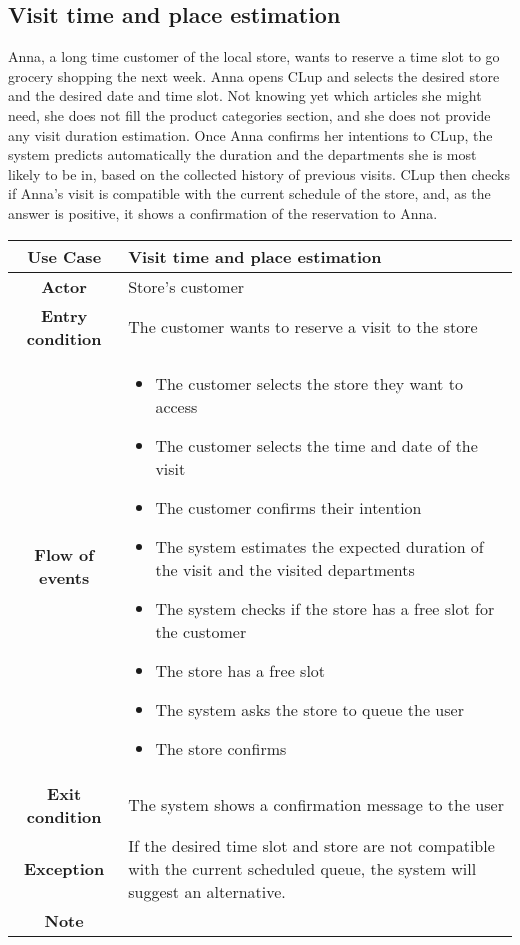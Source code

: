 \documentclass[../../main.tex]{subfiles}
\begin{document}
    \subsection*{Visit time and place estimation}

    Anna, a long time customer of the local store, wants to reserve a time slot to go grocery shopping the next week. 
    Anna opens CLup and selects the desired store and the desired date and time slot. 
    Not knowing yet which articles she might need, she does not fill the product categories section, 
    and she does not provide any visit duration estimation. Once Anna confirms her intentions to CLup, 
    the system predicts automatically the duration and the departments she is most likely to be in, 
    based on the collected history of previous visits. CLup then checks if Anna's visit is compatible with the 
    current schedule of the store, and, as the answer is positive, it shows a confirmation of the reservation to Anna.

    \begin{table}[H]
      \centering
        \begin{tabular}{c m{}}
        \hline
        \textbf{Use Case} & Visit time and place estimation\\ \hline
        \textbf{Actor} & Store's customer\\ \hline
        \textbf{Entry condition} & The customer wants to reserve a visit to the store\\  \hline
        \textbf{Flow of events} & \begin{itemize}
                                    \item The customer selects the store they want to access
                                    \item The customer selects the time and date of the visit
                                    \item The customer confirms their intention
                                    \item The system estimates the expected duration of the visit and the visited departments
                                    \item The system checks if the store has a free slot for the customer
                                    \item The store has a free slot
                                    \item The system asks the store to queue the user
                                    \item The store confirms
                                  \end{itemize}\\ \hline
        \textbf{Exit condition} & The system shows a confirmation message to the user \\ \hline
        \textbf{Exception} & If the desired time slot and store are not compatible with the current scheduled queue, the system will suggest an alternative. \\ \hline
        \textbf{Note} &\\ \hline
        \end{tabular}
    \end{table}
\end{document}
